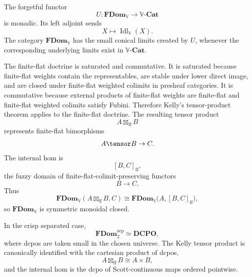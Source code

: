 The forgetful functor
\[
    U:\mathbf{FDom}_{\mathbb V}\to\mathbb V\text{-}\mathbf{Cat}
\]
is monadic.  Its left adjoint sends
\[
    X
    \longmapsto
    \operatorname{Idl}_{\mathbb V}(X).
\]
The category \(\mathbf{FDom}_{\mathbb V}\) has the small conical limits created
by \(U\), whenever the corresponding underlying limits exist in
\(\mathbb V\text{-}\mathbf{Cat}\).

The finite-flat doctrine is saturated and commutative.  It is saturated because
finite-flat weights contain the representables, are stable under lower direct
image, and are closed under finite-flat weighted colimits in presheaf
categories.  It is commutative because external products of finite-flat weights
are finite-flat and finite-flat weighted colimits satisfy Fubini.  Therefore
Kelly's tensor-product theorem applies to the finite-flat doctrine.  The
resulting tensor product
\[
    A\boxtimes_{\mathrm{ff}}B
\]
represents finite-flat bimorphisms
\[
    A\tensor B\to C.
\]
The internal hom is
\[
    [B,C]_{\mathrm{ff}},
\]
the fuzzy domain of finite-flat-colimit-preserving functors
\[
    B\to C.
\]
Thus
\[
    \mathbf{FDom}_{\mathbb V}
    (A\boxtimes_{\mathrm{ff}}B,C)
    \cong
    \mathbf{FDom}_{\mathbb V}
    \bigl(A,[B,C]_{\mathrm{ff}}\bigr),
\]
so \(\mathbf{FDom}_{\mathbb V}\) is symmetric monoidal closed.

In the crisp separated case,
\[
    \mathbf{FDom}_{2}^{\mathrm{sep}}
    \simeq
    \mathbf{DCPO},
\]
where dcpos are taken small in the chosen universe.  The Kelly tensor product is
canonically identified with the cartesian product of dcpos,
\[
    A\boxtimes_{\mathrm{ff}}B
    \cong
    A\times B,
\]
and the internal hom is the dcpo of Scott-continuous maps ordered pointwise.